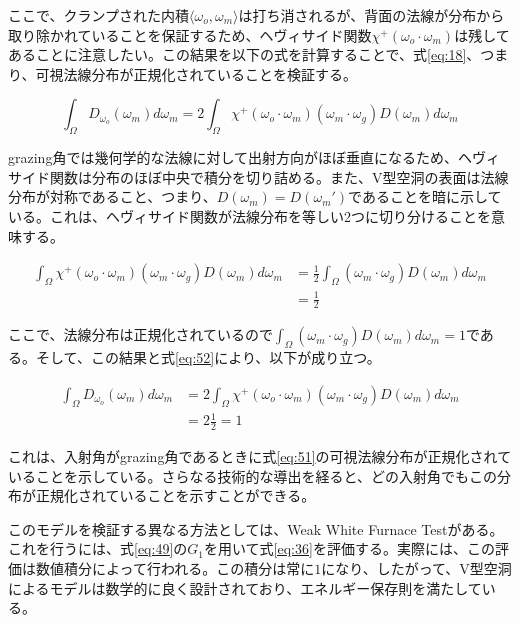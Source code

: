 \documentclass[a4j,xelatex,ja=standard]{bxjsarticle}
\begin{document}
ここで、クランプされた内積$\langle \omega_o, \omega_m \rangle$は打ち消されるが、背面の法線が分布から取り除かれていることを保証するため、ヘヴィサイド関数$\chi^+(\omega_o \cdot \omega_m)$は残してあることに注意したい。この結果を以下の式を計算することで、式\eqref{eq:18}、つまり、可視法線分布が正規化されていることを検証する。

\begin{equation}
    \int_{\Omega} D_{\omega_o}(\omega_m) d\omega_m = 2 \int_{\Omega} \chi^+(\omega_o \cdot \omega_m) (\omega_m \cdot \omega_g) D(\omega_m) d\omega_m
    \label{eq:52}
\end{equation}

grazing角では幾何学的な法線に対して出射方向がほぼ垂直になるため、ヘヴィサイド関数は分布のほぼ中央で積分を切り詰める。また、V型空洞の表面は法線分布が対称であること、つまり、$D(\omega_m) = D(\omega_m')$であることを暗に示している。これは、ヘヴィサイド関数が法線分布を等しい2つに切り分けることを意味する。

\begin{equation}
    \begin{split}
        \int_{\Omega} \chi^+(\omega_o \cdot \omega_m) (\omega_m \cdot \omega_g) D(\omega_m) d\omega_m
        &= \frac{1}{2} \int_{\Omega} (\omega_m \cdot \omega_g) D(\omega_m) d\omega_m \\
        &= \frac{1}{2}
    \end{split}
    \label{eq:53}
\end{equation}

ここで、法線分布は正規化されているので$\int_{\Omega} (\omega_m \cdot \omega_g) D(\omega_m) d\omega_m = 1$である。そして、この結果と式\eqref{eq:52}により、以下が成り立つ。

\begin{equation}
    \begin{split}
        \int_{\Omega} D_{\omega_o}(\omega_m) d\omega_m
        &= 2 \int_{\Omega} \chi^+(\omega_o \cdot \omega_m) (\omega_m \cdot \omega_g) D(\omega_m) d\omega_m \\
        &= 2 \frac{1}{2} = 1
    \end{split}
    \label{eq:54}
\end{equation}

これは、入射角がgrazing角であるときに式\eqref{eq:51}の可視法線分布が正規化されていることを示している。さらなる技術的な導出を経ると、どの入射角でもこの分布が正規化されていることを示すことができる。

このモデルを検証する異なる方法としては、Weak White Furnace Testがある。これを行うには、式\eqref{eq:49}の$G_1$を用いて式\eqref{eq:36}を評価する。実際には、この評価は数値積分によって行われる。この積分は常に$1$になり、したがって、V型空洞によるモデルは数学的に良く設計されており、エネルギー保存則を満たしている。
\end{document}
